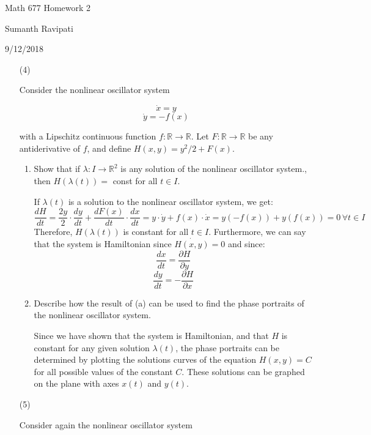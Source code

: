 \documentclass[12pt,letterpaper,reqno]{amsart}
\newcommand{\R}{\mathbb R}
\begin{document}
\thispagestyle{empty}
\centerline{\Large Math 677 Homework 2}
\centerline{Sumanth Ravipati}
\centerline{9/12/2018}
\vspace{.25in}

\begin{enumerate}
\item[(4)]
\begin{flushleft}
Consider the nonlinear oscillator system

$$\dot{x} = y$$
$$\dot{y} = -f(x)$$

with a Lipschitz continuous function $f : \R \rightarrow \R$. Let $F : \R \rightarrow \R$ be any antiderivative of $f$, and define $H(x,y) = y^2/2 + F(x)$.
\newline
\begin{enumerate}
    \item
    \begin{flushleft}
    Show that if $\lambda : I \rightarrow \R^2$ is any solution of the nonlinear oscillator system., then $H(\lambda(t)) =$ const for all $t \in I$.
    \newline
    
    If $\lambda(t)$ is a solution to the nonlinear oscillator system, we get:
    $$\frac{dH}{dt} = \frac{2y}{2}\cdot \frac{dy}{dt} + \frac{dF(x)}{dt}\cdot \frac{dx}{dt} = y\cdot \dot{y} + f(x)\cdot \dot{x} = y(-f(x)) + y(f(x)) = 0 \, \forall t \in I$$
    Therefore, $H(\lambda(t))$ is constant for all $t \in I$. Furthermore, we can say that the system is Hamiltonian since $\dot{H(x,y)} = 0$ and since:
    $$\frac{dx}{dt} = \frac{\partial{H}}{\partial{y}}$$
    $$\frac{dy}{dt} = -\frac{\partial{H}}{\partial{x}}$$
    \end{flushleft}
    \vspace{.15in}
    \item
    \begin{flushleft}
    Describe how the result of (a) can be used to find the phase portraits of the nonlinear oscillator system.
    \newline
    
    Since we have shown that the system is Hamiltonian, and that $H$ is constant for any given solution $\lambda(t)$, the phase portraits can be determined by plotting the solutions curves of the equation $H(x,y) = C$ for all possible values of the constant $C$. These solutions can be graphed on the plane with axes $x(t)$ and $y(t)$.
    \end{flushleft}
\end{enumerate}
\end{flushleft}
\newpage
\item[(5)]
\begin{flushleft}
Consider again the nonlinear oscillator system


\end{flushleft}
\end{enumerate}
\end{document}

